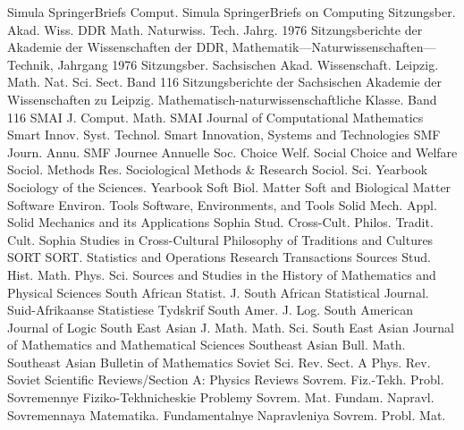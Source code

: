 {Simula SpringerBriefs Comput.}
{Simula SpringerBriefs on Computing}
{Sitzungsber. Akad. Wiss. DDR Math. Naturwiss. Tech. Jahrg. 1976}
{Sitzungsberichte der Akademie der Wissenschaften der DDR, Mathematik---Naturwissenschaften---Technik, Jahrgang 1976}
{Sitzungsber. Sachsischen Akad. Wissenschaft. Leipzig. Math. Nat. Sci. Sect. Band 116}
{Sitzungsberichte der Sachsischen Akademie der Wissenschaften zu Leipzig. Mathematisch-naturwissenschaftliche Klasse. Band 116}
{SMAI J. Comput. Math.}
{SMAI Journal of Computational Mathematics}
{Smart Innov. Syst. Technol.}
{Smart Innovation, Systems and Technologies}
{SMF Journ. Annu.}
{SMF Journee Annuelle}
{Soc. Choice Welf.}
{Social Choice and Welfare}
{Sociol. Methods Res.}
{Sociological Methods & Research}
{Sociol. Sci. Yearbook}
{Sociology of the Sciences. Yearbook}
{Soft Biol. Matter}
{Soft and Biological Matter}
{Software Environ. Tools}
{Software, Environments, and Tools}
{Solid Mech. Appl.}
{Solid Mechanics and its Applications}
{Sophia Stud. Cross-Cult. Philos. Tradit. Cult.}
{Sophia Studies in Cross-Cultural Philosophy of Traditions and Cultures}
{SORT}
{SORT. Statistics and Operations Research Transactions}
{Sources Stud. Hist. Math. Phys. Sci.}
{Sources and Studies in the History of Mathematics and Physical Sciences}
{South African Statist. J.}
{South African Statistical Journal. Suid-Afrikaanse Statistiese Tydskrif}
{South Amer. J. Log.}
{South American Journal of Logic}
{South East Asian J. Math. Math. Sci.}
{South East Asian Journal of Mathematics and Mathematical Sciences}
{Southeast Asian Bull. Math.}
{Southeast Asian Bulletin of Mathematics}
{Soviet Sci. Rev. Sect. A Phys. Rev.}
{Soviet Scientific Reviews/Section A: Physics Reviews}
{Sovrem. Fiz.-Tekh. Probl.}
{Sovremennye Fiziko-Tekhnicheskie Problemy}
{Sovrem. Mat. Fundam. Napravl.}
{Sovremennaya Matematika. Fundamentalnye Napravleniya}
{Sovrem. Probl. Mat.}
